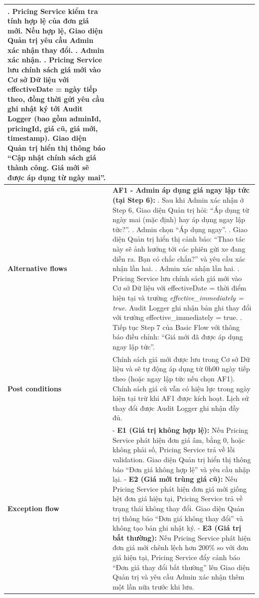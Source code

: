 {\begin{longtable}{|>{\raggedright\arraybackslash}p{4cm}|>{\raggedright\arraybackslash}p{11.5cm}|}
5. Pricing Service kiểm tra tính hợp lệ của đơn giá mới. Nếu hợp lệ, Giao diện Quản trị yêu cầu Admin xác nhận thay đổi. \newline
6. Admin xác nhận. \newline
7. Pricing Service lưu chính sách giá mới vào Cơ sở Dữ liệu với effectiveDate = ngày tiếp theo, đồng thời gửi yêu cầu ghi nhật ký tới Audit Logger (bao gồm adminId, pricingId, giá cũ, giá mới, timestamp). Giao diện Quản trị hiển thị thông báo ``Cập nhật chính sách giá thành công. Giá mới sẽ được áp dụng từ ngày mai''. \\ \hline
\textbf{Alternative flows} &
\textbf{AF1 - Admin áp dụng giá ngay lập tức (tại Step 6):} \newline
6.1. Sau khi Admin xác nhận ở Step 6, Giao diện Quản trị hỏi: ``Áp dụng từ ngày mai (mặc định) hay áp dụng ngay lập tức?''. \newline
6.2. Admin chọn ``Áp dụng ngay''. \newline
6.3. Giao diện Quản trị hiển thị cảnh báo: ``Thao tác này sẽ ảnh hưởng tới các phiên gửi xe đang diễn ra. Bạn có chắc chắn?'' và yêu cầu xác nhận lần hai. \newline
6.4. Admin xác nhận lần hai. \newline
6.5. Pricing Service lưu chính sách giá mới vào Cơ sở Dữ liệu với effectiveDate = thời điểm hiện tại và trường \textit{effective\_immediately = true}. Audit Logger ghi nhận bản ghi thay đổi với trường effective\_immediately = true. \newline
6.6. Tiếp tục Step 7 của Basic Flow với thông báo điều chỉnh: ``Giá mới đã được áp dụng ngay lập tức''. \\ \hline
\textbf{Post conditions} & Chính sách giá mới được lưu trong Cơ sở Dữ liệu và sẽ tự động áp dụng từ 0h00 ngày tiếp theo (hoặc ngay lập tức nếu chọn AF1). Chính sách giá cũ vẫn có hiệu lực trong ngày hiện tại trừ khi AF1 được kích hoạt. Lịch sử thay đổi được Audit Logger ghi nhận đầy đủ. \\ \hline
\textbf{Exception flow} &
- \textbf{E1 (Giá trị không hợp lệ):} Nếu Pricing Service phát hiện đơn giá âm, bằng 0, hoặc không phải số, Pricing Service trả về lỗi validation. Giao diện Quản trị hiển thị thông báo ``Đơn giá không hợp lệ'' và yêu cầu nhập lại. \newline
- \textbf{E2 (Giá mới trùng giá cũ):} Nếu Pricing Service phát hiện đơn giá mới giống hệt đơn giá hiện tại, Pricing Service trả về trạng thái không thay đổi. Giao diện Quản trị thông báo ``Đơn giá không thay đổi'' và không tạo bản ghi nhật ký. \newline
- \textbf{E3 (Giá trị bất thường):} Nếu Pricing Service phát hiện đơn giá mới chênh lệch hơn 200\% so với đơn giá hiện tại, Pricing Service đẩy cảnh báo ``Đơn giá thay đổi bất thường'' lên Giao diện Quản trị và yêu cầu Admin xác nhận thêm một lần nữa trước khi lưu. \\ \hline
\end{longtable}
}

